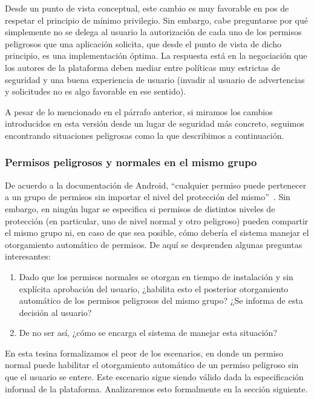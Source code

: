 Desde un punto de vista conceptual, este cambio es muy favorable en pos de respetar el principio de
mínimo privilegio. Sin embargo, cabe preguntarse por qué simplemente no se delega al usuario la
autorización de cada uno de los permisos peligrosos que una aplicación solicita, que desde el punto
de vista de dicho principio, es una implementación óptima. La respuesta está en la negociación que
los autores de la plataforma deben mediar entre políticas muy estrictas de seguridad y una buena
experiencia de usuario (invadir al usuario de advertencias y solicitudes no es algo favorable en ese
sentido).

A pesar de lo mencionado en el párrafo anterior, si miramos los cambios introducidos en esta versión
desde un lugar de seguridad más concreto, seguimos encontrando situaciones peligrosas como la que
describimos a continuación.

\subsubsection{Permisos peligrosos y normales en el mismo grupo}
De acuerdo a la documentación de Android, ``cualquier permiso puede pertenecer a un grupo de
permisos sin importar el nivel del protección del mismo''~\cite{android-permissions}. Sin embargo, en
ningún lugar se especifica si permisos de distintos niveles de protección (en particular, uno de
nivel normal y otro peligroso) pueden compartir el mismo grupo ni, en caso de que sea posible, cómo
debería el sistema manejar el otorgamiento automático de permisos. De aquí se desprenden algunas
preguntas interesantes:
\begin{enumerate}
    \item Dado que los permisos normales se otorgan en tiempo de instalación y sin explícita
          aprobación del usuario, ¿habilita esto el posterior otorgamiento automático de los
          permisos peligrosos del mismo grupo? ¿Se informa de esta decisión al usuario?
    \item De no ser así, ¿cómo se encarga el sistema de manejar esta situación?
\end{enumerate}
En esta tesina formalizamos el peor de los escenarios, en donde un permiso normal puede habilitar el
otorgamiento automático de un permiso peligroso sin que el usuario se entere. Este escenario sigue
siendo válido dada la especificación informal de la plataforma. Analizaremos esto formalmente en la
sección siguiente.


